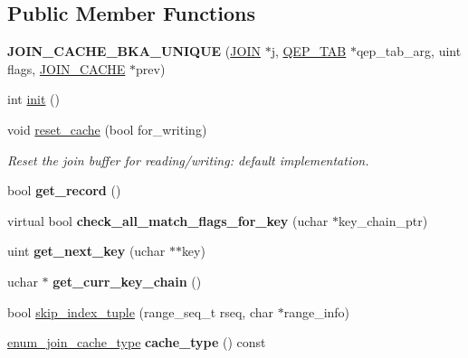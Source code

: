 \subsection*{Public Member Functions}
\begin{DoxyCompactItemize}
\item 
\mbox{\label{classJOIN__CACHE__BKA__UNIQUE_ad3ce48a7263d07d53985845f9a85d7c7}} 
{\bfseries J\+O\+I\+N\+\_\+\+C\+A\+C\+H\+E\+\_\+\+B\+K\+A\+\_\+\+U\+N\+I\+Q\+UE} (\mbox{\hyperlink{classJOIN}{J\+O\+IN}} $\ast$j, \mbox{\hyperlink{classQEP__TAB}{Q\+E\+P\+\_\+\+T\+AB}} $\ast$qep\+\_\+tab\+\_\+arg, uint flags, \mbox{\hyperlink{classJOIN__CACHE}{J\+O\+I\+N\+\_\+\+C\+A\+C\+HE}} $\ast$prev)
\item 
int \mbox{\hyperlink{group__Query__Optimizer_gaa7ca6a85294c32bac8c69bea0c4e5fe1}{init}} ()
\item 
void \mbox{\hyperlink{group__Query__Optimizer_gafb1afc6322b69d01ea68b677b715ddc7}{reset\+\_\+cache}} (bool for\+\_\+writing)
\begin{DoxyCompactList}\small\item\em Reset the join buffer for reading/writing\+: default implementation. \end{DoxyCompactList}\item 
bool {\bfseries get\+\_\+record} ()
\item 
virtual bool {\bfseries check\+\_\+all\+\_\+match\+\_\+flags\+\_\+for\+\_\+key} (uchar $\ast$key\+\_\+chain\+\_\+ptr)
\item 
uint {\bfseries get\+\_\+next\+\_\+key} (uchar $\ast$$\ast$key)
\item 
\mbox{\label{classJOIN__CACHE__BKA__UNIQUE_a7ceb91a2321a85374cd9190de9c9a3fc}} 
uchar $\ast$ {\bfseries get\+\_\+curr\+\_\+key\+\_\+chain} ()
\item 
bool \mbox{\hyperlink{group__Query__Optimizer_ga6afa1e2231c8090ecae73554fca37c41}{skip\+\_\+index\+\_\+tuple}} (range\+\_\+seq\+\_\+t rseq, char $\ast$range\+\_\+info)
\item 
\mbox{\label{classJOIN__CACHE__BKA__UNIQUE_a9e73916095308568c64ba010828965de}} 
\mbox{\hyperlink{classJOIN__CACHE_a74b45254b4573b9531f1b8b536b18e46}{enum\+\_\+join\+\_\+cache\+\_\+type}} {\bfseries cache\+\_\+type} () const
\end{DoxyCompactItemize}
